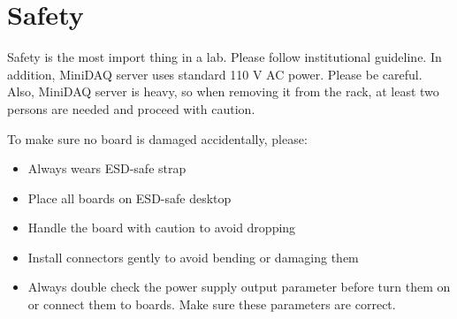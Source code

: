 \section{Safety}
Safety is the most import thing in a lab. Please follow institutional guideline.
In addition, MiniDAQ server uses standard 110 V AC power. Please be careful.
Also, MiniDAQ server is heavy, so when removing it from the rack, at least two
persons are needed and proceed with caution.

To make sure no board is damaged accidentally, please:
\begin{itemize}
    \item Always wears ESD-safe strap
    \item Place all boards on ESD-safe desktop
    \item Handle the board with caution to avoid dropping
    \item Install connectors gently to avoid bending or damaging them
    \item Always double check the power supply output parameter before turn them
        on or connect them to boards. Make sure these parameters are correct.
\end{itemize}
